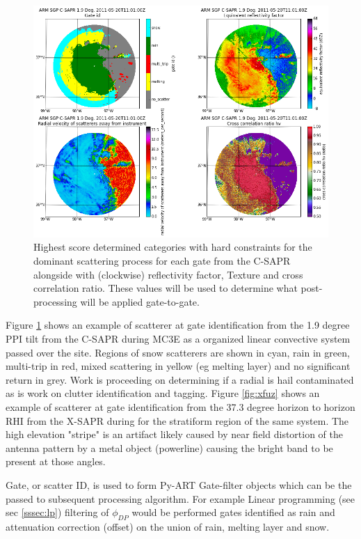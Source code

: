 \documentclass[twocol]{ametsoc}
\begin{document}
\begin{figure}[h]
    \centering
    \includegraphics[width=0.95\columnwidth]{flog.png}
    \caption{Highest score determined categories with hard constraints for the dominant scattering process for each gate from the C-SAPR alongside with (clockwise) reflectivity factor,
    Texture and cross correlation ratio. These values will be used to determine what post-processing will  be applied gate-to-gate.  }
    \label{fig:flog}
\end{figure}

Figure \ref{fig:flog} shows an example of scatterer at gate identification from the 1.9 degree PPI tilt from the C-SAPR during MC3E as a organized linear convective system passed over the site. 
Regions of snow scatterers are shown in cyan, rain in green, multi-trip in red, mixed scattering in yellow (eg melting layer) and no significant return in grey. Work is proceeding on determining if 
a radial is hail contaminated as is work on clutter identification and tagging.  Figure \ref{fig:xfuz} shows an example of scatterer at gate identification from the 37.3 degree horizon to horizon 
RHI from the X-SAPR during for the stratiform region of the same system. The high elevation "stripe" is an artifact likely caused by near field distortion of the antenna pattern by a metal object
(powerline) causing the bright band to be present at those angles. 

Gate, or scatter ID, is used to form Py-ART Gate-filter objects which can be the passed to subsequent processing algorithm. For example Linear programming (see sec \ref{sssec:lp}) filtering of $\phi_{DP}$ 
would be performed gates identified as rain and attenuation correction (offset) on the union of rain, melting layer and snow. 
\end{document}
